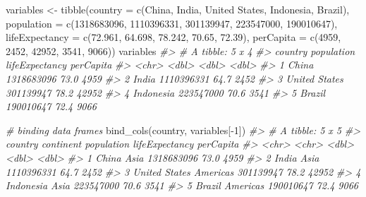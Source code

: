 \documentclass[
]{book}
\newenvironment{Shaded}{\begin{snugshade}}{\end{snugshade}}
\newcommand{\AttributeTok}[1]{\textcolor[rgb]{0.77,0.63,0.00}{#1}}
\newcommand{\CommentTok}[1]{\textcolor[rgb]{0.56,0.35,0.01}{\textit{#1}}}
\newcommand{\DecValTok}[1]{\textcolor[rgb]{0.00,0.00,0.81}{#1}}
\newcommand{\FloatTok}[1]{\textcolor[rgb]{0.00,0.00,0.81}{#1}}
\newcommand{\FunctionTok}[1]{\textcolor[rgb]{0.00,0.00,0.00}{#1}}
\newcommand{\NormalTok}[1]{#1}
\newcommand{\OtherTok}[1]{\textcolor[rgb]{0.56,0.35,0.01}{#1}}
\newcommand{\SpecialCharTok}[1]{\textcolor[rgb]{0.00,0.00,0.00}{#1}}
\newcommand{\StringTok}[1]{\textcolor[rgb]{0.31,0.60,0.02}{#1}}
\begin{document}
\begin{Shaded}
\begin{Highlighting}[]
\NormalTok{variables }\OtherTok{\textless{}{-}} 
\FunctionTok{tibble}\NormalTok{(}\AttributeTok{country =} \FunctionTok{c}\NormalTok{(}\StringTok{\textquotesingle{}China\textquotesingle{}}\NormalTok{, }\StringTok{\textquotesingle{}India\textquotesingle{}}\NormalTok{, }\StringTok{\textquotesingle{}United States\textquotesingle{}}\NormalTok{, }\StringTok{\textquotesingle{}Indonesia\textquotesingle{}}\NormalTok{, }\StringTok{\textquotesingle{}Brazil\textquotesingle{}}\NormalTok{),}
       \AttributeTok{population =} \FunctionTok{c}\NormalTok{(}\DecValTok{1318683096}\NormalTok{, }\DecValTok{1110396331}\NormalTok{, }\DecValTok{301139947}\NormalTok{, }\DecValTok{223547000}\NormalTok{, }\DecValTok{190010647}\NormalTok{),}
       \AttributeTok{lifeExpectancy =} \FunctionTok{c}\NormalTok{(}\FloatTok{72.961}\NormalTok{, }\FloatTok{64.698}\NormalTok{, }\FloatTok{78.242}\NormalTok{, }\FloatTok{70.65}\NormalTok{, }\FloatTok{72.39}\NormalTok{),}
       \AttributeTok{perCapita =} \FunctionTok{c}\NormalTok{(}\DecValTok{4959}\NormalTok{, }\DecValTok{2452}\NormalTok{, }\DecValTok{42952}\NormalTok{, }\DecValTok{3541}\NormalTok{, }\DecValTok{9066}\NormalTok{))}
\NormalTok{variables}
\CommentTok{\#\textgreater{} \# A tibble: 5 x 4}
\CommentTok{\#\textgreater{}   country       population lifeExpectancy perCapita}
\CommentTok{\#\textgreater{}   \textless{}chr\textgreater{}              \textless{}dbl\textgreater{}          \textless{}dbl\textgreater{}     \textless{}dbl\textgreater{}}
\CommentTok{\#\textgreater{} 1 China         1318683096           73.0      4959}
\CommentTok{\#\textgreater{} 2 India         1110396331           64.7      2452}
\CommentTok{\#\textgreater{} 3 United States  301139947           78.2     42952}
\CommentTok{\#\textgreater{} 4 Indonesia      223547000           70.6      3541}
\CommentTok{\#\textgreater{} 5 Brazil         190010647           72.4      9066}

\CommentTok{\# binding data frames}
\FunctionTok{bind\_cols}\NormalTok{(country, variables[}\SpecialCharTok{{-}}\DecValTok{1}\NormalTok{])}
\CommentTok{\#\textgreater{} \# A tibble: 5 x 5}
\CommentTok{\#\textgreater{}   country       continent population lifeExpectancy perCapita}
\CommentTok{\#\textgreater{}   \textless{}chr\textgreater{}         \textless{}chr\textgreater{}          \textless{}dbl\textgreater{}          \textless{}dbl\textgreater{}     \textless{}dbl\textgreater{}}
\CommentTok{\#\textgreater{} 1 China         Asia      1318683096           73.0      4959}
\CommentTok{\#\textgreater{} 2 India         Asia      1110396331           64.7      2452}
\CommentTok{\#\textgreater{} 3 United States Americas   301139947           78.2     42952}
\CommentTok{\#\textgreater{} 4 Indonesia     Asia       223547000           70.6      3541}
\CommentTok{\#\textgreater{} 5 Brazil        Americas   190010647           72.4      9066}
\end{Highlighting}
\end{Shaded}
\end{document}
